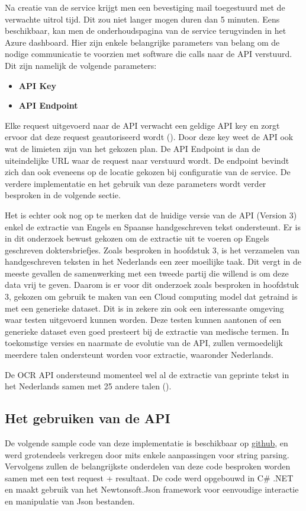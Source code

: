Na creatie van de service krijgt men een bevestiging mail toegestuurd met de verwachte uitrol tijd. Dit zou niet langer mogen duren dan 5 minuten. Eens beschikbaar, kan men de onderhoudspagina van de service terugvinden in het Azure dashboard. Hier zijn enkele belangrijke parameters van belang om de nodige communicatie te voorzien met software die calls naar de API verstuurd. Dit zijn namelijk de volgende parameters:  
 
\begin{itemize}
	\item \textbf{API Key }
	\item \textbf{API Endpoint}
\end{itemize}

Elke request uitgevoerd naar de API verwacht een geldige API key en zorgt ervoor dat deze request geautoriseerd wordt (\cite{Microsoft2019a}). Door deze key weet de API ook wat de limieten zijn van het gekozen plan. De API Endpoint is dan de uiteindelijke URL waar de request naar verstuurd wordt. De endpoint bevindt zich dan ook eveneens op de locatie gekozen bij configuratie van de service. De verdere implementatie en het gebruik van deze parameters wordt verder besproken in de volgende sectie.


Het is echter ook nog op te merken dat de huidige versie van de API (Version 3) enkel de extractie van Engels en Spaanse handgeschreven tekst ondersteunt.  Er is in dit onderzoek bewust gekozen om de extractie uit te voeren op Engels geschreven doktersbriefjes. Zoals besproken in hoofdstuk 3, is het verzamelen van handgeschreven teksten in het Nederlands een zeer moeilijke taak. Dit vergt in de meeste gevallen de samenwerking met een tweede partij die willend is om deze data vrij te geven. Daarom is er voor dit onderzoek zoals besproken in hoofdstuk 3, gekozen om gebruik te maken van een Cloud computing model dat getraind is met een generieke dataset. Dit is in zekere zin ook een interessante omgeving waar testen uitgevoerd kunnen worden. Deze testen kunnen aantonen of een generieke dataset even goed presteert bij de extractie van medische termen. In toekomstige versies en naarmate de evolutie van de API, zullen vermoedelijk meerdere talen ondersteunt worden voor extractie, waaronder Nederlands. 

De OCR API ondersteund momenteel wel al de extractie van geprinte tekst in het Nederlands samen met 25 andere talen (\cite{Microsoft2019b}). 


\subsection{Het gebruiken van de API}
De volgende sample code van deze implementatie is beschikbaar op  \href{https://github.com/Helmidyh/HD\_Bachelorscriptie\_Software\_2020}{github},  en werd grotendeels verkregen door \cite{Microsoft2020h} mits enkele aanpassingen voor string parsing. Vervolgens zullen de belangrijkste onderdelen van deze code besproken worden samen met een test request + resultaat. De code werd opgebouwd in C\# .NET en maakt gebruik van het Newtonsoft.Json framework voor eenvoudige interactie en manipulatie van Json bestanden. 
 

